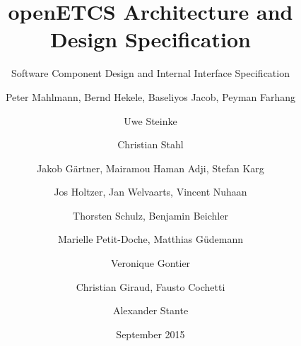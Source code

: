 \documentclass[oneside]{template/openetcs_report}
\begin{document}
\frontmatter
{}

\newcommand{\define}[1]{\index{#1}\emph{#1}}







\title{openETCS Architecture and Design Specification}

\subtitle{Software Component Design and Internal Interface Specification}

\date{September 2015}








\author{Peter Mahlmann, Bernd Hekele, Baseliyos Jacob, Peyman Farhang}

\author{Uwe Steinke}

\author{Christian Stahl}

\author{Jakob G\"artner, Mairamou Haman Adji, Stefan Karg}

\author{Jos Holtzer, Jan Welvaarts, Vincent Nuhaan}

\author{Thorsten Schulz, Benjamin Beichler}

\author{Marielle Petit-Doche, Matthias G\"udemann}

\author{Veronique Gontier}

\author{Christian Giraud, Fausto Cochetti}

\author{Alexander Stante}
\end{document}
